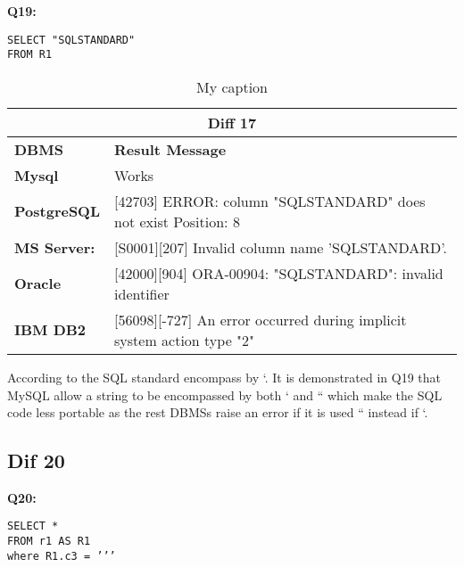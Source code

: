 \begin{mdframed}[backgroundcolor=gray!20] 
\textbf{Q19:}
\begin{lstlisting}
SELECT "SQLSTANDARD"
FROM R1
\end{lstlisting}
\end{mdframed} 

 
\begin{table}[h]
\centering
\caption{My caption}
\label{my-label}
\begin{tabular}{|p{2cm}|p{12cm}|}
\hline
\multicolumn{2}{|c|}{\textbf{Diff 17}}                                                                                                 \\ \hline
\textbf{DBMS}                              & \textbf{Result Message}                                                                   \\ \hline
{\color[HTML]{333333} \textbf{Mysql}}      & {\color[HTML]{333333} Works}                                                              \\ \hline
{\color[HTML]{333333} \textbf{PostgreSQL}} & {\color[HTML]{333333} {[}42703{]} ERROR: column "SQLSTANDARD" does not exist Position: 8} \\ \hline
{\color[HTML]{333333} \textbf{MS Server:}} & {\color[HTML]{333333} {[}S0001{]}{[}207{]} Invalid column name 'SQLSTANDARD'.}            \\ \hline
\textbf{Oracle}                            & {[}42000{]}{[}904{]} ORA-00904: "SQLSTANDARD": invalid identifier                         \\ \hline
\textbf{IBM DB2}                           & {[}56098{]}{[}-727{]} An error occurred during implicit system action type "2"            \\ \hline
\end{tabular}
\end{table}

According to the SQL standard encompass by ‘. It is demonstrated in Q19 that MySQL allow a string to be encompassed by both ‘ and “ which make the SQL code less portable as the rest DBMSs raise an error if it is used “ instead if ‘. 


\subsection{Dif 20}

\begin{mdframed}[backgroundcolor=gray!20] 
\textbf{Q20:}
\begin{lstlisting}
SELECT *
FROM r1 AS R1
where R1.c3 = ’’’
\end{lstlisting}
\end{mdframed} 

